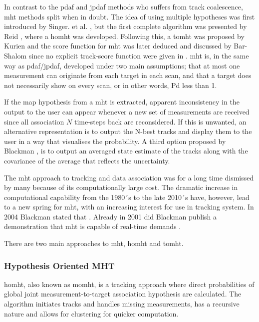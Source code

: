 In contrast to the \gls{pdaf} and \gls{jpdaf} methods who suffers from track coalescence, \gls{mht} methods split when in doubt. The idea of using multiple hypotheses was first introduced by Singer. et al. \cite{Singer1974}, but the first complete algorithm was presented by Reid \cite{Reid1979}, where a \gls{homht} was developed. Following this, a \gls{tomht} was proposed by Kurien \cite{Kurien1990} and the \gls{score} function for \gls{mht} was later deduced and discussed by Bar-Shalom \cite{Bar-Shalom2007} since no explicit track-score function were given in \cite{Kurien1990}. \gls{mht} is, in the same way as \gls{pdaf}/\gls{jpdaf}, developed under two main assumptions; that at most one \gls{measurement} can originate from each \gls{target} in each scan, and that a \gls{target} does not necessarily show on every scan, or in other words, \gls{Pd} less than 1.

If the \gls{map} hypothesis from a \gls{mht} is extracted, apparent inconsistency in the output to the user can appear whenever a new set of \glspl{measurement} are received since all association $N$ time-steps back are reconsidered. If this is unwanted, an alternative representation is to output the N-best tracks and display them to the user in a way that visualises the probability. A third option proposed by Blackman \cite{Blackman2004}, is to output an averaged state estimate of the tracks along with the covariance of the average that reflects the uncertainty.

The \gls{mht} approach to tracking and data association was for a long time dismissed by many because of its computationally large cost. The dramatic increase in computational capability from the 1980´s to the late 2010´s have, however, lead to a new spring for \gls{mht}, with an increasing interest for use in tracking system. In 2004 Blackman stated that \cite{Blackman2004}. Already in 2001 did Blackman publish a demonstration that \gls{mht} is capable of real-time demands \cite{Blackman2001}.

There are two main approaches to \gls{mht}, \gls{homht} and \gls{tomht}.

\subsubsection{Hypothesis Oriented MHT}
\gls{homht}, also known as \gls{momht}, is a tracking approach where direct probabilities of global joint measurement-to-target association hypothesis are calculated. The algorithm initiates tracks and handles missing \glspl{measurement}, has a recursive nature and allows for clustering for quicker computation.

